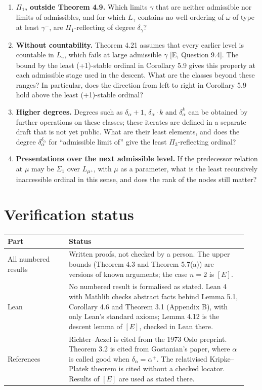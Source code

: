\documentclass[11pt]{article}
\begin{document}
\begin{enumerate}
\item \textbf{$\Pi_1$, outside Theorem 4.9.} Which limits $\gamma$ that are neither admissible nor limits of
  admissibles, and for which $L_\gamma$ contains no well-ordering of $\omega$ of type at least $\gamma^-$, are
  $\Pi_1$-reflecting of degree $\delta_\gamma$?
\item \textbf{Without countability.} Theorem 4.21 assumes that every earlier level is countable in $L_\gamma$, which
  fails at large admissible $\gamma$ [E, Question 9.4]. The bound by the least (+1)-stable ordinal in Corollary 5.9 gives this
  property at each admissible stage used in the descent. What are the classes beyond these ranges? In particular, does
  the direction from left to right in Corollary 5.9 hold above the least (+1)-stable ordinal?
\item \textbf{Higher degrees.} Degrees such as $\delta_\alpha + 1$, $\delta_\alpha \cdot k$ and $\delta_\alpha^k$ can
  be obtained by further operations on these classes; these iterates are defined in a separate draft that is not yet
  public. What are their least elements, and does the degree
  $\delta_\alpha^{\delta_\alpha}$ for ``admissible limit of'' give the least $\Pi_3$-reflecting ordinal?
\item \textbf{Presentations over the next admissible level.} If the predecessor relation at $\mu$ may be $\Sigma_1$ over
  $L_{\mu^+}$, with $\mu$ as a parameter, what is the least recursively inaccessible ordinal in this sense, and does the
  rank of the nodes still matter?
\end{enumerate}

\section{Verification status}

\begin{center}\begin{tabular}{p{0.24\linewidth}p{0.70\linewidth}}
\toprule
Part & Status \\
\midrule
All numbered results & Written proofs, not checked by a person. The upper bounds (Theorem 4.3 and Theorem 5.7(a))
are versions of known arguments; the case $n = 2$ is $[E]$. \\
Lean & No numbered result is formalised as stated. Lean 4 with Mathlib checks abstract facts behind Lemma 5.1,
  Corollary 4.6 and Theorem 3.1 (Appendix B), with only Lean's standard axioms; Lemma 4.12 is the descent lemma of
  $[E]$, checked in Lean there. \\
References & Richter--Aczel is cited from the 1973 Oslo preprint. Theorem 3.2 is cited from Gostanian's paper, where
$\alpha$ is called good when $\delta_\alpha = \alpha^+$. The relativised Kripke--Platek theorem is cited without a checked locator. Results of $[E]$ are used as stated there. \\
\bottomrule
\end{tabular}\end{center}
\end{document}
